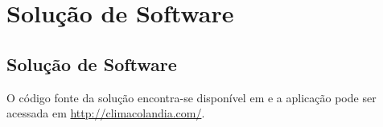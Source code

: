 \part{Solução de Software}
\chapter[Solução de Software]{Solução de Software}

O código fonte da solução encontra-se disponível em \cite{git} e a aplicação pode ser acessada em \url{http://climacolandia.com/}.